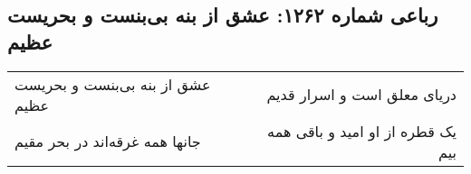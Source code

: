 \begin{center}
\section*{رباعی شماره ۱۲۶۲: عشق از بنه بی‌بنست و بحریست عظیم}
\label{sec:1262}
\begin{longtable}{l p{0.5cm} r}
عشق از بنه بی‌بنست و بحریست عظیم
&&
دریای معلق است و اسرار قدیم
\\
جانها همه غرقه‌اند در بحر مقیم
&&
یک قطره از او امید و باقی همه بیم
\\
\end{longtable}
\end{center}
